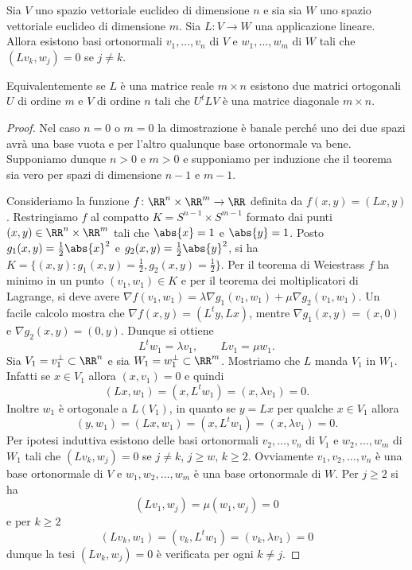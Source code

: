 \begin{theorem}
  \label{th:decomposizione_singolare}
Sia $V$ uno spazio vettoriale euclideo di dimensione $n$ e sia
sia $W$ uno spazio vettoriale euclideo di dimensione $m$.
Sia $L\colon V\to W$ una applicazione lineare.
Allora esistono basi ortonormali $v_1,\dots,v_n$ di $V$ e 
$w_1,\dots,w_m$ di $W$ tali che $(L v_k,w_j) = 0$ se $j\neq k$.

Equivalentemente se $L$ è una matrice reale $m\times n$ esistono 
due matrici ortogonali $U$ di ordine $m$ e $V$ di ordine $n$ tali che
$ U^t L V$ è una matrice diagonale $m\times n$.
\end{theorem}

\begin{proof}
Nel caso $n=0$ o $m=0$ la dimostrazione è banale perché uno dei due spazi 
avrà una base vuota e per l'altro qualunque base ortonormale va bene. 
Supponiamo dunque $n>0$ e $m>0$ e supponiamo per induzione 
che il teorema sia vero per spazi di dimensione $n-1$ e $m-1$.

Consideriamo la funzione $f\colon \RR^n\times \RR^m \to \RR$ definita da
$f(x,y) = (L x, y)$.
Restringiamo $f$ al compatto $K=S^{n-1}\times S^{m-1}$
formato dai punti $(x,y)\in\RR^n\times \RR^m$ tali che $\abs{x} = 1$ e $\abs{y} = 1$.
Posto $g_1(x,y) = \frac 1 2 \abs{x}^2$ e $g_2(x,y) = \frac 1 2 \abs{y}^2$,
si ha $K=\{(x,y) \colon g_1(x,y) = \frac 1 2, g_2(x,y) = \frac 1 2\}$.
Per il teorema di Weiestrass $f$ ha minimo in un punto $(v_1,w_1)\in K$ 
e per il teorema dei moltiplicatori di Lagrange, si deve avere
$\nabla f(v_1,w_1) = \lambda \nabla g_1(v_1,w_1) + \mu \nabla g_2(v_1,w_1)$.
Un facile calcolo mostra che $\nabla f(x,y) = (L^t y, L x)$,
mentre $\nabla g_1(x,y) = (x,0)$ e $\nabla g_2(x,y) = (0,y)$. 
Dunque si ottiene
\[
L^t w_1 = \lambda v_1, \qquad L v_1 = \mu w_1.
\]
Sia $V_1 = v_1^\perp \subset \RR^n$ e sia $W_1 = w_1^\perp \subset \RR^m$.
Mostriamo che $L$ manda $V_1$ in $W_1$. 
Infatti se $x\in V_1$ allora $(x,v_1) = 0$ e quindi
\[
(L x, w_1) = (x, L^t w_1) = (x, \lambda v_1) = 0.
\]
Inoltre $w_1$ è ortogonale a $L(V_1)$, in quanto 
se $y = L x$ per qualche $x\in V_1$ allora
\[
(y,w_1) = (L x, w_1) = (x, L^t w_1) = (x, \lambda v_1) = 0.
\]
Per ipotesi induttiva esistono delle basi ortonormali $v_2,\dots, v_n$ di $V_1$ 
e $w_2,\dots,w_m$ di $W_1$ tali che
$(L v_k, w_j) = 0$ se $j\neq k$, $j\ge w$, $k\ge 2$.
Ovviamente $v_1,v_2,\dots, v_n$ è una base ortonormale di $V$ e
$w_1,w_2,\dots,w_m$ è una base ortonormale di $W$.
Per $j\ge 2$ si ha 
\[   
  (L v_1, w_j) = \mu (w_1, w_j) = 0 
\]
e per $k\ge 2$ 
\[
  (L v_k, w_1) = (v_k, L^t w_1) = (v_k, \lambda v_1) = 0
\]
dunque la tesi $(L v_k, w_j) = 0$ è verificata per ogni $k\neq j$.
\end{proof}


